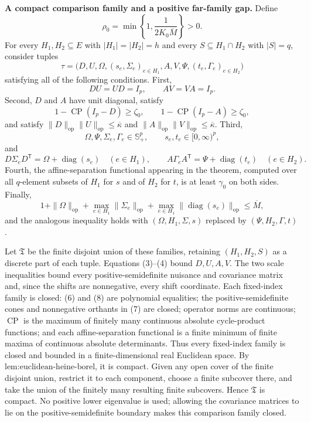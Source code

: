 \textbf{A compact comparison family and a positive far-family gap.}
Define
\[
\rho_0=\min\left\{1,\frac{1}{2K_0\overline M}\right\}>0.
\tag{5}
\]
For every \(H_1,H_2\subseteq E\) with \(|H_1|=|H_2|=h\) and every \(S\subseteq H_1\cap H_2\) with \(|S|=q\), consider tuples
\[
\tau=\bigl(D,U,\Omega,(s_e,\Sigma_e)_{e\in H_1},
A,V,\Psi,(t_e,\Gamma_e)_{e\in H_2}\bigr)
\]
satisfying all of the following conditions. First,
\[
DU=UD=I_p,
\qquad
AV=VA=I_p.
\tag{6}
\]
Second, \(D\) and \(A\) have unit diagonal, satisfy
\[
1-\operatorname{CP}(I_p-D)\geq\zeta_0,
\qquad
1-\operatorname{CP}(I_p-A)\geq\zeta_0,
\]
and satisfy \(\|D\|_{\mathrm{op}}\|U\|_{\mathrm{op}}\leq\overline\kappa\) and \(\|A\|_{\mathrm{op}}\|V\|_{\mathrm{op}}\leq\overline\kappa\). Third,
\[
\Omega,\Psi,\Sigma_e,\Gamma_e\in\mathbb S_+^p,
\qquad
s_e,t_e\in[0,\infty)^p,
\tag{7}
\]
and
\[
D\Sigma_eD^{\mathsf T}=\Omega+\operatorname{diag}(s_e)
\quad(e\in H_1),
\qquad
A\Gamma_eA^{\mathsf T}=\Psi+\operatorname{diag}(t_e)
\quad(e\in H_2).
\tag{8}
\]
Fourth, the affine-separation functional appearing in the theorem, computed over all \(q\)-element subsets of \(H_1\) for \(s\) and of \(H_2\) for \(t\), is at least \(\gamma_0\) on both sides. Finally,
\[
1+\|\Omega\|_{\mathrm{op}}
+\max_{e\in H_1}\|\Sigma_e\|_{\mathrm{op}}
+\max_{e\in H_1}\|\operatorname{diag}(s_e)\|_{\mathrm{op}}
\leq\overline M,
\tag{9}
\]
and the analogous inequality holds with \((\Omega,H_1,\Sigma,s)\) replaced by \((\Psi,H_2,\Gamma,t)\).

Let \(\mathfrak T\) be the finite disjoint union of these families, retaining \((H_1,H_2,S)\) as a discrete part of each tuple. Equations (3)--(4) bound \(D,U,A,V\). The two scale inequalities bound every positive-semidefinite nuisance and covariance matrix and, since the shifts are nonnegative, every shift coordinate. Each fixed-index family is closed: (6) and (8) are polynomial equalities; the positive-semidefinite cones and nonnegative orthants in (7) are closed; operator norms are continuous; \(\operatorname{CP}\) is the maximum of finitely many continuous absolute cycle-product functions; and each affine-separation functional is a finite minimum of finite maxima of continuous absolute determinants. Thus every fixed-index family is closed and bounded in a finite-dimensional real Euclidean space. By \(\text{lem:euclidean-heine-borel}\), it is compact. Given any open cover of the finite disjoint union, restrict it to each component, choose a finite subcover there, and take the union of the finitely many resulting finite subcovers. Hence \(\mathfrak T\) is compact. No positive lower eigenvalue is used; allowing the covariance matrices to lie on the positive-semidefinite boundary makes this comparison family closed.

